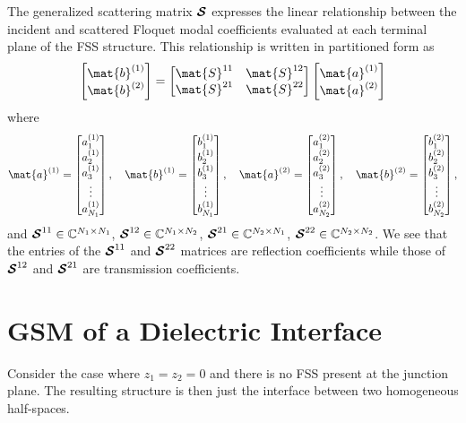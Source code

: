 The generalized scattering matrix
 $\boldsymbol{\mathcal{S}}$ expresses the linear relationship between the incident and
scattered Floquet modal coefficients evaluated at each terminal plane of the FSS
structure.  This relationship is written in partitioned form as
\begin{equation}
  \label{eq:gsm}
  \colvec{\mat{b}\one \\ \mat{b}\two} = 
  \begin{bmatrix}
    \mat{S}^{11} & \mat{S}^{12} \\
    \mat{S}^{21} & \mat{S}^{22} 
  \end{bmatrix}
  \colvec{\mat{a}\one \\ \mat{a}\two}
\end{equation}
where
\begin{equation}
    \mat{a}\one = 
    \colvec{a\one_1\\ a\one_2\\ a\one_3\\ \vdots \\ a\one_{N_1}},
    \quad
    \mat{b}\one = 
    \colvec{b\one_1 \\ b\one_2 \\ b\one_3 \\ \vdots \\ b\one_{N_1}},
    \quad
    \mat{a}\two = 
    \colvec{a\two_1 \\ a\two_2 \\ a\two_3 \\ \vdots \\ a\two_{N_2}},
    \quad
    \mat{b}\two = 
    \colvec{b\two_1 \\ b\two_2 \\ b\two_3 \\ \vdots \\ b\two_{N_2}},
\end{equation}
and $\boldsymbol{\mathcal{S}}^{11} \in \mathbb{C}^{N_1\times N_1}$,
$\boldsymbol{\mathcal{S}}^{12} \in \mathbb{C}^{N_1\times N_2}$,
$\boldsymbol{\mathcal{S}}^{21} \in \mathbb{C}^{N_2\times N_1}$,
$\boldsymbol{\mathcal{S}}^{22} \in \mathbb{C}^{N_2\times N_2}$.
We see that the entries of the $\boldsymbol{\mathcal{S}}^{11}$ and $\boldsymbol{\mathcal{S}}^{22}$
matrices are
reflection coefficients while those of $\boldsymbol{\mathcal{S}}^{12}$ and 
$\boldsymbol{\mathcal{S}}^{21}$ are transmission coefficients.

\section{GSM of a Dielectric Interface}
Consider the case where $z_1 = z_2 = 0$ and there is no FSS present at
the junction plane.  The resulting structure is then just the
interface between two homogeneous half-spaces.

